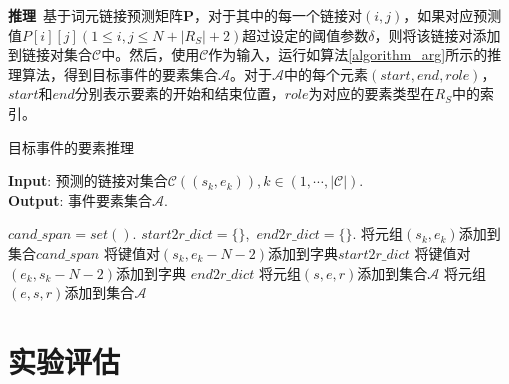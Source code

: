 \textbf{推理}~基于词元链接预测矩阵$\boldsymbol{P}$，对于其中的每一个链接对$(i,j)$，如果对应预测值${P}[i][j](1 \leq i,j \leq N+|R_{S}|+2)$超过设定的阈值参数$\delta$，则将该链接对添加到链接对集合$\mathcal{C}$中。然后，使用$\mathcal{C}$作为输入，运行如算法\ref{algorithm_arg}所示的推理算法，得到目标事件的要素集合$\mathcal{A}$。对于$\mathcal{A}$中的每个元素$(start, end, role)$，$start$和$end$分别表示要素的开始和结束位置，$role$为对应的要素类型在$R_{S}$中的索引。 

\begin{algorithm}[tb]
\caption{目标事件的要素推理}
\label{algorithm_arg}
\textbf{Input}: 预测的链接对集合$\mathcal{C}((s_{k},e_{k})), k \in (1,\cdots,|\mathcal{C}|)$.\\
\textbf{Output}: 事件要素集合$\mathcal{A}$.
\begin{algorithmic}[1] %
\STATE $cand\_span=set()$.
\STATE $start2r\_dict=\{\}$,~$end2r\_dict=\{\}$.
\STATE 将元组$(s_{k},e_{k})$添加到集合$cand\_span$
\STATE 将键值对$(s_{k},e_{k}-N-2)$添加到字典$start2r\_dict$
\STATE 将键值对$(e_{k},s_{k}-N-2)$添加到字典
$end2r\_dict$
\ENDIF
\ENDFOR
{}
\STATE 将元组$(s,e,r)$添加到集合$\mathcal{A}$
\ENDFOR
{}
\STATE 将元组$(e,s,r)$添加到集合$\mathcal{A}$
\ENDFOR
\ENDFOR
\end{algorithmic}
\end{algorithm}

\section{实验评估}
\label{section_5_3}
